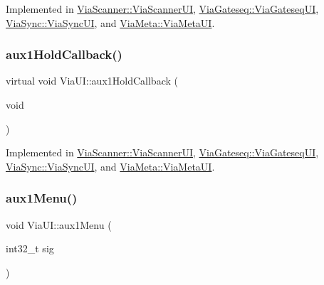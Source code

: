 Implemented in \mbox{\hyperlink{class_via_scanner_1_1_via_scanner_u_i_a4ca2d4cfed7e8e23f056c622a825c085}{Via\+Scanner\+::\+Via\+Scanner\+UI}}, \mbox{\hyperlink{class_via_gateseq_1_1_via_gateseq_u_i_ae1a1c7c97151e09b2e6b136f0c1efe6e}{Via\+Gateseq\+::\+Via\+Gateseq\+UI}}, \mbox{\hyperlink{class_via_sync_1_1_via_sync_u_i_a9e9fd5bc4d9d9cfe255a8cf099ba5110}{Via\+Sync\+::\+Via\+Sync\+UI}}, and \mbox{\hyperlink{class_via_meta_1_1_via_meta_u_i_a84e9b3d83d81753db095d67dee1fe8b9}{Via\+Meta\+::\+Via\+Meta\+UI}}.

\mbox{\label{class_via_u_i_a6fcc3b7cf9b97ccf403ed1817cb10d1d}} 
\subsubsection{\texorpdfstring{aux1\+Hold\+Callback()}{aux1HoldCallback()}}
{\footnotesize\ttfamily virtual void Via\+U\+I\+::aux1\+Hold\+Callback (\begin{DoxyParamCaption}\item[{void}]{ }\end{DoxyParamCaption})\hspace{0.3cm}{\ttfamily [pure virtual]}}



Implemented in \mbox{\hyperlink{class_via_scanner_1_1_via_scanner_u_i_a634c06fae2a1a17e5f3737dd44b34e10}{Via\+Scanner\+::\+Via\+Scanner\+UI}}, \mbox{\hyperlink{class_via_gateseq_1_1_via_gateseq_u_i_ac0a66889f6859802f3594031f81f05f3}{Via\+Gateseq\+::\+Via\+Gateseq\+UI}}, \mbox{\hyperlink{class_via_sync_1_1_via_sync_u_i_aaa66c2014e79270140575713998d67ae}{Via\+Sync\+::\+Via\+Sync\+UI}}, and \mbox{\hyperlink{class_via_meta_1_1_via_meta_u_i_a1c38639df8fdb4a866622388548bc9db}{Via\+Meta\+::\+Via\+Meta\+UI}}.

\mbox{\label{class_via_u_i_aaee6701bf5a06d4064caa2443d96f61d}} 
\subsubsection{\texorpdfstring{aux1\+Menu()}{aux1Menu()}}
{\footnotesize\ttfamily void Via\+U\+I\+::aux1\+Menu (\begin{DoxyParamCaption}\item[{int32\+\_\+t}]{sig }\end{DoxyParamCaption})}

